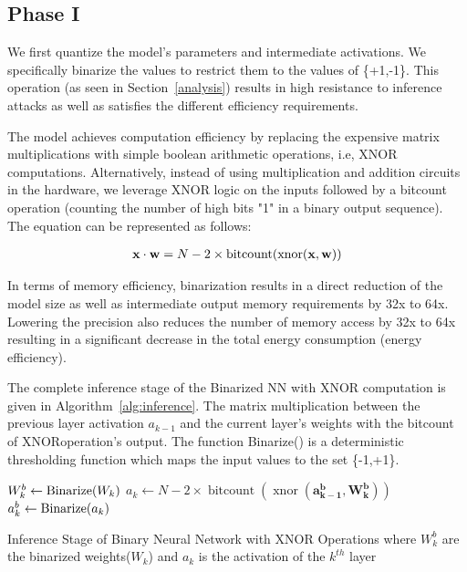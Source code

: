 \subsection{Phase I}
\label{p1}

We first quantize the model's parameters and intermediate activations. We specifically binarize the values to restrict them to the values of \{+1,-1\}.
This operation (as seen in Section~\ref{analysis}) results in high resistance to inference attacks as well as satisfies the different efficiency requirements.

The model achieves computation efficiency by replacing the expensive matrix multiplications with simple boolean arithmetic operations, i.e, XNOR computations.
Alternatively, instead of using multiplication and addition circuits in the hardware, we leverage XNOR logic on the inputs followed by a bitcount operation (counting the number of high bits "1" in a binary output sequence).
The equation can be represented as follows:

\begin{align}
\footnotesize
\mathbf{x} \cdot \mathbf{w} =
N - 2\times\operatorname{bitcount}(\operatorname{xnor}(\mathbf{x}, \mathbf{w}))
\end{align}

In terms of memory efficiency, binarization results in a direct reduction of the model size as well as intermediate output memory requirements by 32x to 64x.
Lowering the precision also reduces the number of memory access by 32x to 64x resulting in a significant decrease in the total energy consumption (energy efficiency).


The complete inference stage of the Binarized NN with XNOR computation is given in Algorithm~\ref{alg:inference}.
The matrix multiplication between the previous layer activation $a_{k-1}$ and the current layer's weights with the bitcount of XNORoperation's output.
The function Binarize() is a deterministic thresholding function which maps the input values to the set \{-1,+1\}.

\begin{algorithm}
\footnotesize
\begin{algorithmic}
        \STATE $W_k^b \leftarrow {\rm Binarize}(W_k)$
        \STATE $a_k \leftarrow N - 2\times\operatorname{bitcount}(\operatorname{xnor}(\mathbf{a_{k-1}^b}, \mathbf{W_k^b}))$
            \STATE $a_k^b \leftarrow {\rm Binarize}(a_k)$
        \ENDIF
    \ENDFOR
\end{algorithmic}
\caption{Inference Stage of Binary Neural Network with XNOR Operations where $W_k^b$ are the binarized weights($W_k$) and $a_k$ is the activation of the $k^{th}$ layer}
\label{alg:inference}
\end{algorithm}



